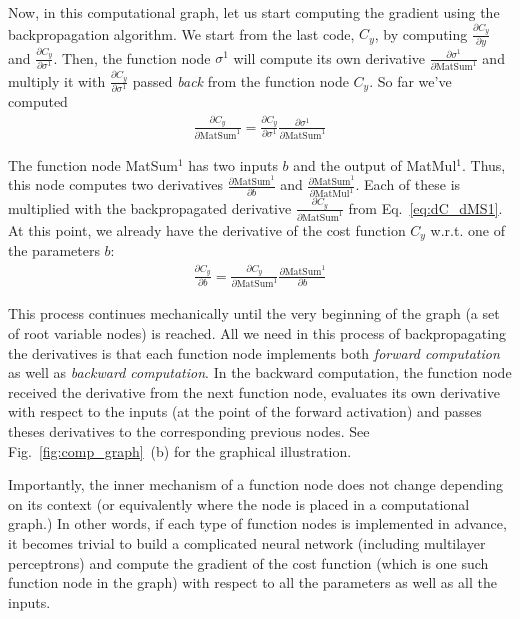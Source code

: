 \documentclass{report}
\begin{document}
Now, in this computational graph, let us start computing the gradient using the
backpropagation algorithm. We start from the last code, $C_y$, by computing
$\frac{\partial C_y}{\partial y}$ and $\frac{\partial C_y}{\partial \sigma^1}$.
Then, the function node $\sigma^1$ will compute its own derivative
$\frac{\partial \sigma^1}{\partial \text{MatSum}^1}$ and multiply it with
$\frac{\partial C_y}{\partial \sigma^1}$ passed {\em back} from the function
node $C_y$. So far we've computed
\begin{align}
    \label{eq:dC_dMS1}
    \frac{\partial C_y}{\partial \text{MatSum}^1} = \frac{\partial C_y}{\partial \sigma^1} \frac{\partial \sigma^1}{\partial
    \text{MatSum}^1}
\end{align}

The function node MatSum$^1$ has two inputs $b$ and the output of MatMul$^1$.
Thus, this node computes two derivatives $\frac{\partial
\text{MatSum}^1}{\partial b}$ and $\frac{\partial \text{MatSum}^1}{\partial
\text{MatMul}^1}$. Each of these is multiplied with the backpropagated
derivative $\frac{\partial C_y}{\partial \text{MatSum}^1}$ from
Eq.~\eqref{eq:dC_dMS1}. At this point, we already have the derivative of the
cost function $C_y$ w.r.t. one of the parameters $b$:
\begin{align*}
    \frac{\partial C_y}{\partial b} = \frac{\partial C_y}{\partial
    \text{MatSum}^1} \frac{\partial \text{MatSum}^1}{\partial b}
\end{align*}

This process continues mechanically until the very beginning of the graph (a set
of root variable nodes) is reached. All we need in this process of
backpropagating the derivatives is that each function node implements both {\em
forward computation} as well as {\em backward computation}. In the backward
computation, the function node received the derivative from the next function
node, evaluates its own derivative with respect to the inputs (at the point of
the forward activation) and passes theses
derivatives to the corresponding previous nodes. See
Fig.~\ref{fig:comp_graph}~(b) for the graphical illustration.

Importantly, the inner mechanism of a function node does not change depending on
its context (or equivalently where the node is placed in a computational graph.)
In other words, if each type of function nodes is implemented in advance, it
becomes trivial to build a complicated neural network (including multilayer
perceptrons) and compute the gradient of the cost function (which is one such
function node in the graph) with respect to all the parameters as well as all
the inputs.
\end{document}
